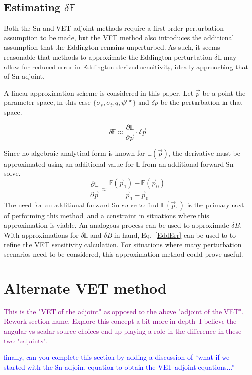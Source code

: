\documentclass[12pt]{report}
\newcommand{\vp}{\vec{p}}
\newcommand{\Edd}{\mathbb{E}}
\newcommand{\BEdd}{B}
\newcommand{\comment}[2]{\marginpar{\textcolor{#2}{$\star$}}\textcolor{#2}{#1}\newline}
\newcommand{\jcr}[1]{\comment{#1}{blue}}
\newcommand{\todo}[1]{\comment{#1}{purple}}
\newcommand{\jcr}[1]{\phantom{a}}
\newcommand{\todo}[1]{\phantom{a}}
\begin{document}
\subsection{Estimating $\delta \Edd$}
Both the Sn and VET adjoint methods require a first-order perturbation assumption to be made, but the VET method also introduces the additional assumption that the Eddington remains unperturbed. As such, it seems reasonable that methods to approximate the Eddington perturbation $\delta \Edd$ may allow for reduced error in Eddington derived sensitivity, ideally approaching that of Sn adjoint. 

A linear approximation scheme is considered in this paper. Let $\vp$ be a point the  parameter space, in this case $\lbrace \sigma_s , \sigma_t, q, \psi^{\text{inc}} \rbrace$ and $\delta p$ be the perturbation in that space.

\begin{equation}
\delta \Edd \approx \frac{\partial \Edd}{\partial \vp} \cdot \delta \vp
\end{equation}

Since no algebraic analytical form is known for $\Edd ( \vp )$, the derivative must be approximated using an additional value for $\Edd$ from an additional forward Sn solve.
\begin{equation}
\label{Eddapprox}
\frac{\partial \Edd}{\partial \vp} \approx \frac{\Edd(\vp_1) - \Edd(\vp_0)}{\vp_1 - \vp_0}
\end{equation}
The need for an additional forward Sn solve to find $\Edd(\vp_1)$ is the primary cost of performing this method, and a constraint in situations where this approximation is viable. An analogous process can be used to approximate $\delta \BEdd$. With approximations for $\delta \Edd$ and $\delta \BEdd$ in hand, Eq.~\eqref{EddErr} can be used to to refine the VET sensitivity calculation. For situations where many perturbation scenarios need to be considered, this approximation method could prove useful. 

\section{Alternate VET method}
\todo{This is the "VET of the adjoint" as opposed to the above "adjoint of the VET". Rework section name. Explore this concept a bit more in-depth. I believe the angular vs scalar source choices end up playing a role in the difference in these two "adjoints".}


\jcr{finally, can you complete this section by adding a discussion of "`what if we started with the Sn adjoint equation to obtain the VET adjoint equations..."'}
\end{document}
